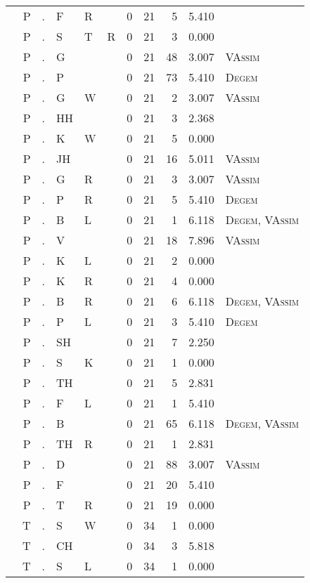 \begin{longtable}{r@{ } r@{ } c@{ } l@{ } l@{ } l@{ } r r r r l }
 & P & . & F & R &  & 0 & 21 & 5 & 5.410 &  \\
 & P & . & S & T & R & 0 & 21 & 3 & 0.000 &  \\
 & P & . & G &  &  & 0 & 21 & 48 & 3.007 & \textsc{VAssim} \\
 & P & . & P &  &  & 0 & 21 & 73 & 5.410 & \textsc{Degem} \\
 & P & . & G & W &  & 0 & 21 & 2 & 3.007 & \textsc{VAssim} \\
 & P & . & HH &  &  & 0 & 21 & 3 & 2.368 &  \\
 & P & . & K & W &  & 0 & 21 & 5 & 0.000 &  \\
 & P & . & JH &  &  & 0 & 21 & 16 & 5.011 & \textsc{VAssim} \\
 & P & . & G & R &  & 0 & 21 & 3 & 3.007 & \textsc{VAssim} \\
 & P & . & P & R &  & 0 & 21 & 5 & 5.410 & \textsc{Degem} \\
 & P & . & B & L &  & 0 & 21 & 1 & 6.118 & \textsc{Degem}, \textsc{VAssim} \\
 & P & . & V &  &  & 0 & 21 & 18 & 7.896 & \textsc{VAssim} \\
 & P & . & K & L &  & 0 & 21 & 2 & 0.000 &  \\
 & P & . & K & R &  & 0 & 21 & 4 & 0.000 &  \\
 & P & . & B & R &  & 0 & 21 & 6 & 6.118 & \textsc{Degem}, \textsc{VAssim} \\
 & P & . & P & L &  & 0 & 21 & 3 & 5.410 & \textsc{Degem} \\
 & P & . & SH &  &  & 0 & 21 & 7 & 2.250 &  \\
 & P & . & S & K &  & 0 & 21 & 1 & 0.000 &  \\
 & P & . & TH &  &  & 0 & 21 & 5 & 2.831 &  \\
 & P & . & F & L &  & 0 & 21 & 1 & 5.410 &  \\
 & P & . & B &  &  & 0 & 21 & 65 & 6.118 & \textsc{Degem}, \textsc{VAssim} \\
 & P & . & TH & R &  & 0 & 21 & 1 & 2.831 &  \\
 & P & . & D &  &  & 0 & 21 & 88 & 3.007 & \textsc{VAssim} \\
 & P & . & F &  &  & 0 & 21 & 20 & 5.410 &  \\
 & P & . & T & R &  & 0 & 21 & 19 & 0.000 &  \\
 & T & . & S & W &  & 0 & 34 & 1 & 0.000 &  \\
 & T & . & CH &  &  & 0 & 34 & 3 & 5.818 &  \\
 & T & . & S & L &  & 0 & 34 & 1 & 0.000 &  \\

\end{longtable}
